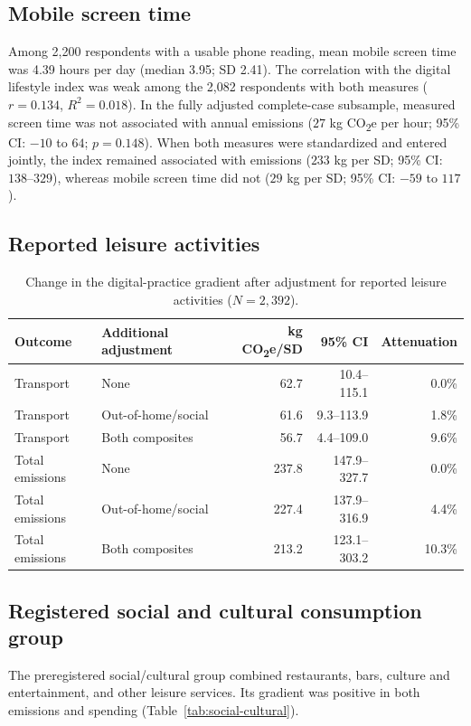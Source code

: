 \documentclass[11pt,a4paper]{article}
\begin{document}
\subsection{Mobile screen time}
Among 2,200 respondents with a usable phone reading, mean mobile screen time was
4.39 hours per day (median 3.95; SD 2.41). The correlation with the digital
lifestyle index was weak among the 2,082 respondents with both measures
($r=0.134$, $R^2=0.018$). In the fully adjusted complete-case subsample,
measured screen time was not associated with annual emissions ($27$ kg
CO\textsubscript{2}e per hour; 95\% CI: $-10$ to $64$; $p=0.148$). When both
measures were standardized and entered jointly, the index remained associated
with emissions ($233$ kg per SD; 95\% CI: $138$--$329$), whereas mobile screen
time did not ($29$ kg per SD; 95\% CI: $-59$ to $117$).

\subsection{Reported leisure activities}
\begin{table}[htbp]
	\centering
	\caption{Change in the digital-practice gradient after adjustment for
		reported leisure activities ($N=2,392$).}
	\begin{tabular}{@{}llrrr@{}}
		\toprule
		Outcome & Additional adjustment & kg CO\textsubscript{2}e/SD & 95\% CI & Attenuation \\
		\midrule
		Transport & None & 62.7 & 10.4--115.1 & 0.0\% \\
		Transport & Out-of-home/social & 61.6 & 9.3--113.9 & 1.8\% \\
		Transport & Both composites & 56.7 & 4.4--109.0 & 9.6\% \\
		Total emissions & None & 237.8 & 147.9--327.7 & 0.0\% \\
		Total emissions & Out-of-home/social & 227.4 & 137.9--316.9 & 4.4\% \\
		Total emissions & Both composites & 213.2 & 123.1--303.2 & 10.3\% \\
		\bottomrule
	\end{tabular}
\end{table}

\subsection{Registered social and cultural consumption group}
The preregistered social/cultural group combined restaurants, bars, culture and
entertainment, and other leisure services. Its gradient was positive in both
emissions and spending (Table~\ref{tab:social-cultural}).
\end{document}
